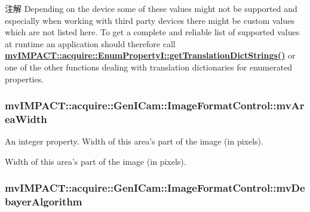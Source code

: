 \begin{DoxyNote}{注解}
Depending on the device some of these values might not be supported and especially when working with third party devices there might be custom values which are not listed here. To get a complete and reliable list of supported values at runtime an application should therefore call {\bfseries \hyperlink{classmv_i_m_p_a_c_t_1_1acquire_1_1_enum_property_i_a0ba6ccbf5ee69784d5d0b537924d26b6}{mv\+I\+M\+P\+A\+C\+T\+::acquire\+::\+Enum\+Property\+I\+::get\+Translation\+Dict\+Strings()}} or one of the other functions dealing with translation dictionaries for enumerated properties. 
\end{DoxyNote}
\hypertarget{classmv_i_m_p_a_c_t_1_1acquire_1_1_gen_i_cam_1_1_image_format_control_a6804a01fa7faa08f73491fb0aa1d7c05}{
\subsubsection[{mv\+Area\+Width}]{ mv\+I\+M\+P\+A\+C\+T\+::acquire\+::\+Gen\+I\+Cam\+::\+Image\+Format\+Control\+::mv\+Area\+Width}}\label{classmv_i_m_p_a_c_t_1_1acquire_1_1_gen_i_cam_1_1_image_format_control_a6804a01fa7faa08f73491fb0aa1d7c05}


An integer property. Width of this area's part of the image (in pixels). 

Width of this area's part of the image (in pixels). \hypertarget{classmv_i_m_p_a_c_t_1_1acquire_1_1_gen_i_cam_1_1_image_format_control_a859caad7f8c8da99428ad30eb7c23c90}{
\subsubsection[{mv\+Debayer\+Algorithm}]{ mv\+I\+M\+P\+A\+C\+T\+::acquire\+::\+Gen\+I\+Cam\+::\+Image\+Format\+Control\+::mv\+Debayer\+Algorithm}}\label{classmv_i_m_p_a_c_t_1_1acquire_1_1_gen_i_cam_1_1_image_format_control_a859caad7f8c8da99428ad30eb7c23c90}


